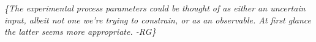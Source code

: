 \documentclass[11pt]{article}
\newcommand{\remrg}[1]{ {\it \color{drkgrn} \{#1 -RG\}}}
\begin{document}
\remrg{The experimental process parameters could be
  thought of as either an uncertain input, albeit not one we're
  trying to constrain, or as an observable. At first glance the latter
  seems more appropriate.}

%




 
\end{document}
